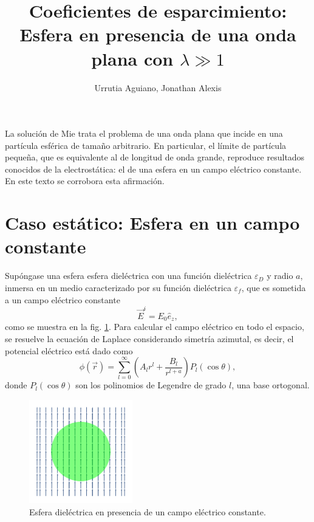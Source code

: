\documentclass[letterpaper, 12pt] {article}
\title{\LARGE \bf 
Coeficientes de esparcimiento: Esfera en presencia de una onda plana con $\lambda\gg 1$}
\author{Urrutia Aguiano, Jonathan Alexis}
\date{}
\begin{document}
\maketitle

La solución de Mie trata el problema de una onda plana que incide en una partícula esférica de tamaño arbitrario. En particular, el límite de partícula pequeña, que es equivalente al de longitud de onda grande, reproduce resultados conocidos de la electrostática: el de una esfera en un campo eléctrico constante. En este texto se corrobora esta afirmación.

\section{Caso estático: Esfera en un campo constante}

Supóngase una esfera esfera dieléctrica con una función dieléctrica $\varepsilon_D$ y radio $a$, inmersa en un  medio caracterizado por su función dieléctrica $\varepsilon_f$, que es sometida a un campo eléctrico constante 
\begin{equation}
\vec{E}^{i} = E_0 \hat{e}_z,
\end{equation}
como se muestra en la fig. \ref{fig:est}. Para calcular el campo eléctrico en todo el espacio, se resuelve la ecuación de Laplace considerando simetría azimutal, es decir, el potencial eléctrico está dado como
\begin{equation}
\phi (\vec{r}) = \sum_{l=0}^\infty  \left(A_l r^l + \frac{B_l}{r^{l+a}}\right)P_l(\cos\theta),
\end{equation}
donde $P_l(\cos\theta)$ son los polinomios de Legendre de grado $l$, una base ortogonal. 
\begin{figure}[h]\centering
\begin{minipage}{.8\linewidth}\centering
\includegraphics[width=4.5cm]{problemaEst}
\caption{\footnotesize  Esfera dieléctrica en presencia de un campo eléctrico constante.}
\label{fig:est}
\end{minipage}
\end{figure}
\end{document}
